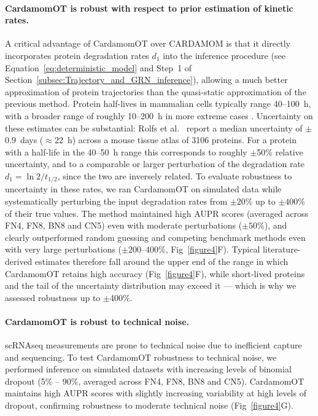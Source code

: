 \documentclass[a4paper, 11pt]{article}
\theoremstyle{plain}
\theoremstyle{remark}
\newcommand*{\firstreview}[1]{{\color{black}#1}}
\begin{document}
\paragraph{CardamomOT is robust with respect to prior estimation of kinetic rates.}
A critical advantage of CardamomOT over CARDAMOM is that it directly incorporates protein degradation rates $d_1$ into the inference procedure (see Equation~\eqref{eq:deterministic_model} and Step~1 of Section~\ref{subsec:Trajectory_and_GRN_inference}), allowing a much better approximation of protein trajectories than the quasi-static approximation of the previous method.
\firstreview{Protein half-lives in mammalian cells typically range 40--100~h, with a broader
range of roughly 10--200~h in more extreme cases \cite{Dear2024, schwanhausser2011global}.
Uncertainty on these estimates can be substantial: Rolfs et al.\ \cite{Rolfs2021} report a
median uncertainty of $\pm$0.9~days ($\approx$22~h) across a mouse tissue atlas of 3106
proteins. For a protein with a half-life in the 40--50~h range this corresponds to roughly
$\pm$50\% relative uncertainty, and to a comparable or larger perturbation of the degradation
rate $d_1 = \ln 2 / t_{1/2}$, since the two are inversely related. To evaluate robustness to uncertainty in these rates, we ran CardamomOT on simulated data while systematically perturbing the input degradation rates from $\pm 20\%$ up to $\pm 400\%$ of their true values. The method maintained high AUPR scores (averaged across FN4, FN8, BN8 and CN5) even with moderate perturbations ($\pm 50\%$), and clearly outperformed random guessing and competing benchmark methods even with very large perturbations ($\pm 200$--$400\%$, Fig~\ref{figure4}F).
Typical literature-derived
estimates therefore fall around the upper end of the range in which CardamomOT retains high
accuracy (Fig~\ref{figure4}F), while short-lived proteins and the tail of the uncertainty
distribution may exceed it --- which is why we assessed robustness up to $\pm$400\%.}


\firstreview{
\paragraph{CardamomOT is robust to technical noise.}
scRNAseq measurements are prone to technical noise due to inefficient capture and sequencing. To test CardamomOT robustness to technical noise, we performed inference on simulated datasets with increasing levels of binomial dropout (5\% -- 90\%, averaged across FN4, FN8, BN8 and CN5). CardamomOT maintains high AUPR scores with slightly increasing variability at high levels of dropout, confirming robustness to moderate technical noise (Fig~\ref{figure4}G). 
}
\end{document}
